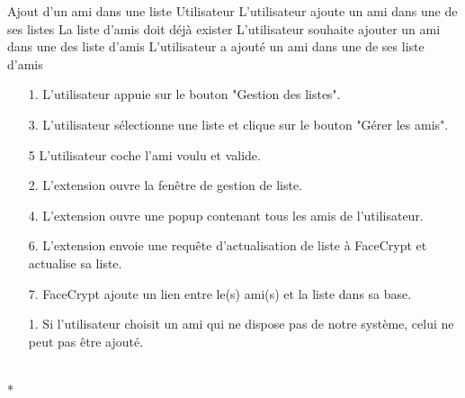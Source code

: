 \documentclass[a4paper,11pt,french]{article}
\begin{document}
\fiche
	{Ajout d'un ami dans une liste}
	{Utilisateur}
    {L'utilisateur ajoute un ami dans une de ses listes}
    {La liste d'amis doit déjà exister}
    {L'utilisateur souhaite ajouter un ami dans une des liste d'amis}
	{L'utilisateur a ajouté un ami dans une de ses liste d'amis}
    {\begin{itemize}
        \item[]
        \item[1.] L'utilisateur appuie sur le bouton "Gestion des listes".
        \item[3.] L'utilisateur sélectionne une liste et clique sur le bouton 
        "Gérer les amis".
        \item[5] L'utilisateur coche l'ami voulu et valide.
    \end{itemize}}
	{\begin{itemize}
        \item[]
        \item[2.] L'extension ouvre la fenêtre de gestion de liste.
		\item[4.] L'extension ouvre une popup contenant tous les amis de 
		l'utilisateur.
		\item[6.] L'extension envoie une requête d'actualisation de liste à
		 FaceCrypt et actualise sa liste.
		\item[7.] FaceCrypt ajoute un lien entre le(s) ami(s) et la liste
		dans sa base.
	\end{itemize}
	}
	{}
\flots
    {\begin{itemize}
    \item[]
    \item[1.] Si l'utilisateur choisit un ami qui ne dispose pas de notre 
    système, celui ne peut pas être ajouté.
    \end{itemize}
    }
    {}
\\*
\end{document}
